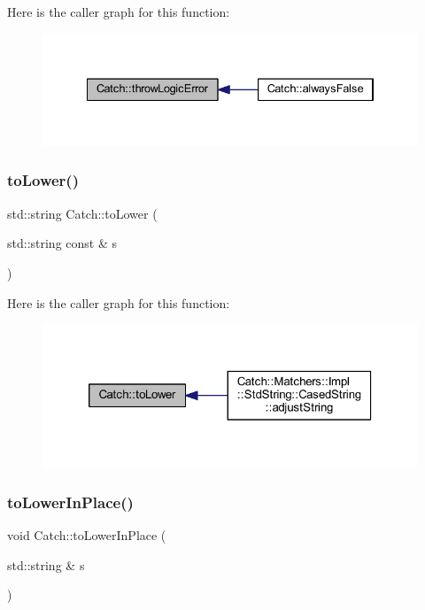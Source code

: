 Here is the caller graph for this function\+:\nopagebreak
\begin{figure}[H]
\begin{center}
\leavevmode
\includegraphics[width=334pt]{namespace_catch_a702b612f683d154c466ea8297ed4a20d_icgraph}
\end{center}
\end{figure}
\hypertarget{namespace_catch_ac036a17412d318598ffda8e1fe7a1177}{}\label{namespace_catch_ac036a17412d318598ffda8e1fe7a1177} 
\subsubsection{\texorpdfstring{to\+Lower()}{toLower()}}
{\footnotesize\ttfamily std\+::string Catch\+::to\+Lower (\begin{DoxyParamCaption}\item[{std\+::string const \&}]{s }\end{DoxyParamCaption})}

Here is the caller graph for this function\+:\nopagebreak
\begin{figure}[H]
\begin{center}
\leavevmode
\includegraphics[width=320pt]{namespace_catch_ac036a17412d318598ffda8e1fe7a1177_icgraph}
\end{center}
\end{figure}
\hypertarget{namespace_catch_a0760dbe87d090a55a35414db57d272c4}{}\label{namespace_catch_a0760dbe87d090a55a35414db57d272c4} 
\subsubsection{\texorpdfstring{to\+Lower\+In\+Place()}{toLowerInPlace()}}
{\footnotesize\ttfamily void Catch\+::to\+Lower\+In\+Place (\begin{DoxyParamCaption}\item[{std\+::string \&}]{s }\end{DoxyParamCaption})}

